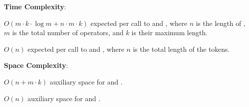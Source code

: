 \textbf{Time Complexity}:
\begin{compactitem}
  \item $O(m \cdot k \cdot \log m + n \cdot m \cdot k)$ expected per call to  and , where $n$ is the length of , $m$ is the total number of operators, and $k$ is their maximum length.
  \item $O(n)$ expected per call to  and , where $n$ is the total length of the tokens.
\end{compactitem}

\textbf{Space Complexity}:
\begin{compactitem}
  \item $O(n + m \cdot k)$ auxiliary space for  and .
  \item $O(n)$ auxiliary space for  and .
\end{compactitem}

